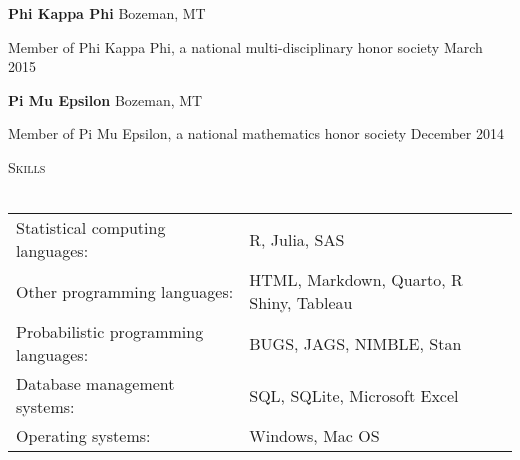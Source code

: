 \documentclass[a4paper]{article}
\newcommand{\lineunder} {
	\vspace*{-8pt} \\
	\hspace*{-18pt} \hrulefill \\
}
\newcommand{\header} [1] {
	{\hspace*{-18pt}\vspace*{6pt} \textcolor{Cerulean}{\textsc{#1}}}
	\vspace*{-6pt} \textcolor{Cerulean}{\lineunder}
}
\begin{document}
\textbf{Phi Kappa Phi} \hfill Bozeman, MT

Member of Phi Kappa Phi, a national multi-disciplinary honor society
\hfill March 2015

\vspace*{2mm}

\textbf{Pi Mu Epsilon} \hfill Bozeman, MT

Member of Pi Mu Epsilon, a national mathematics honor society
\hfill December 2014

\vspace*{2mm}

\header{Skills}
\vspace*{2mm}
\begin{tabular}{ l l }
  Statistical computing languages:  & R, Julia, SAS \\
    Other programming languages:         &  HTML, Markdown, Quarto, R Shiny, Tableau \\
  Probabilistic programming languages:         & BUGS, JAGS, NIMBLE, Stan \\
    Database management systems:         & SQL, SQLite, Microsoft Excel \\
    Operating systems:       & Windows, Mac OS \\
\end{tabular}
\vspace*{2mm}
\end{document}
